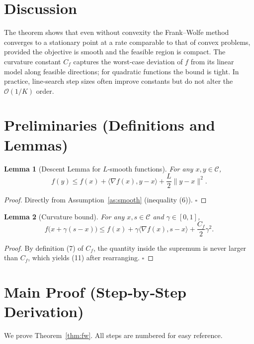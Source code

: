 \documentclass{article}
\newtheorem{lemma}{Lemma}
\newcommand{\curv}{C_f}
\begin{document}
\section*{Discussion}
The theorem shows that even without convexity the Frank–Wolfe method
converges to a stationary point at a rate comparable to that of convex
problems, provided the objective is smooth and the feasible region is compact.
The curvature constant $\curv$ captures the worst‑case deviation of $f$ from its
linear model along feasible directions; for quadratic functions the bound is
tight.  In practice, line‑search step sizes often improve constants but do not
alter the $\mathcal O(1/K)$ order.

\section*{Preliminaries (Definitions and Lemmas)}
\begin{lemma}[Descent Lemma for $L$‑smooth functions]\label{lem:descent}
For any $x,y\in\mathcal C$,
\[
f(y)\le f(x)+\langle\nabla f(x),y-x\rangle+\frac{L}{2}\|y-x\|^{2}.
\tag{10}
\]
\end{lemma}
\begin{proof}
Directly from Assumption~\ref{as:smooth} (inequality (6)). \hfill $\square$
\end{proof}

\begin{lemma}[Curvature bound]\label{lem:curv}
For any $x,s\in\mathcal C$ and $\gamma\in[0,1]$,
\[
f\bigl(x+\gamma(s-x)\bigr)\le
f(x)+\gamma\langle\nabla f(x),s-x\rangle+\frac{\curv}{2}\gamma^{2}.
\tag{11}
\]
\end{lemma}
\begin{proof}
By definition (7) of $\curv$, the quantity inside the supremum is never
larger than $\curv$, which yields (11) after rearranging. \hfill $\square$
\end{proof}

\section*{Main Proof (Step‑by‑Step Derivation)}
We prove Theorem~\ref{thm:fw}.  All steps are numbered for easy reference.
\end{document}
